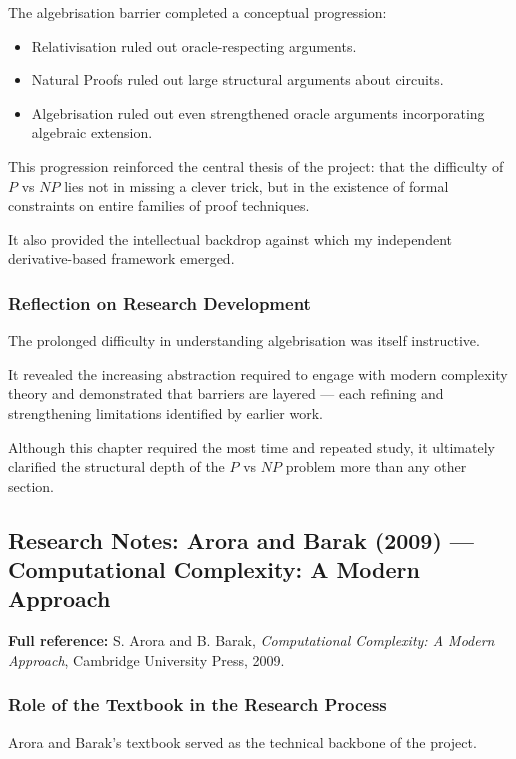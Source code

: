 \documentclass[12pt]{article}
\begin{document}
The algebrisation barrier completed a conceptual progression:

\begin{itemize}
\item Relativisation ruled out oracle-respecting arguments.
\item Natural Proofs ruled out large structural arguments about circuits.
\item Algebrisation ruled out even strengthened oracle arguments incorporating algebraic extension.
\end{itemize}

This progression reinforced the central thesis of the project: that the difficulty of $P$ vs $NP$ lies not in missing a clever trick, but in the existence of formal constraints on entire families of proof techniques.

It also provided the intellectual backdrop against which my independent derivative-based framework emerged.

\subsubsection*{Reflection on Research Development}

The prolonged difficulty in understanding algebrisation was itself instructive.

It revealed the increasing abstraction required to engage with modern complexity theory and demonstrated that barriers are layered --- each refining and strengthening limitations identified by earlier work.

Although this chapter required the most time and repeated study, it ultimately clarified the structural depth of the $P$ vs $NP$ problem more than any other section.

\subsection{Research Notes: Arora and Barak (2009) --- Computational Complexity: A Modern Approach}

\textbf{Full reference:} S. Arora and B. Barak, \textit{Computational Complexity: A Modern Approach}, Cambridge University Press, 2009.

\subsubsection*{Role of the Textbook in the Research Process}

Arora and Barak's textbook served as the technical backbone of the project.
\end{document}
